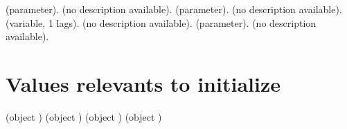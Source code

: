  \label{Quality}(parameter). (no description available).
  \label{x}(parameter). (no description available).
  \label{Age}(variable, 1 lags). (no description available).
  \label{QVI}(parameter). (no description available).
 \section{Values relevants to initialize}
(object )  \newline 
(object )  \newline 
(object )  \newline 
(object )  \newline 
